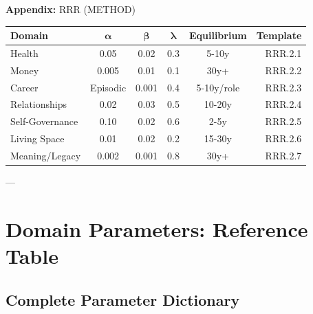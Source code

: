 
\begin{tcolorbox}[colback=blue!5!white, colframe=blue!75!black, title=Quick Reference: Domain Parameters]
\textbf{Appendix:} RRR (METHOD)


\small
\begin{tabular}{@{}lccccr@{}}
\toprule
\textbf{Domain} & $\boldsymbol{\alpha}$ & $\boldsymbol{\beta}$ & $\boldsymbol{\lambda}$ & \textbf{Equilibrium} & \textbf{Template} \\
\midrule
Health & 0.05 & 0.02 & 0.3 & 5-10y & RRR.2.1 \\
Money & 0.005 & 0.01 & 0.1 & 30y+ & RRR.2.2 \\
Career & Episodic & 0.001 & 0.4 & 5-10y/role & RRR.2.3 \\
Relationships & 0.02 & 0.03 & 0.5 & 10-20y & RRR.2.4 \\
Self-Governance & 0.10 & 0.02 & 0.6 & 2-5y & RRR.2.5 \\
Living Space & 0.01 & 0.02 & 0.2 & 15-30y & RRR.2.6 \\
Meaning/Legacy & 0.002 & 0.001 & 0.8 & 30y+ & RRR.2.7 \\
\midrule
\end{tabular}

\end{tcolorbox}

---


\section{Domain Parameters: Reference Table}
\label{rrr:parameters}

\subsection{Complete Parameter Dictionary}

